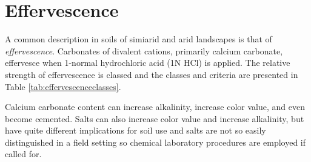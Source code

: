 \documentclass[letterpaper, 12pt]{article}
\begin{document}


 
 \section{Effervescence}
 \label{effervescence}
 

A common description in soils of simiarid and arid landscapes is that of \textit{effervescence}. Carbonates of divalent cations, primarily calcium carbonate, effervesce when 1-normal hydrochloric acid (1N HCl) is applied. The relative strength of effervescence is classed and the classes and criteria are presented in Table \ref{tab:effervescenceclasses}.

Calcium carbonate content can increase alkalinity, increase color value, and even become cemented. Salts can also increase color value and increase alkalinity, but have quite different implications for soil use and salts are not so easily distinguished in a field setting so chemical laboratory procedures are employed if called for.
\end{document}
